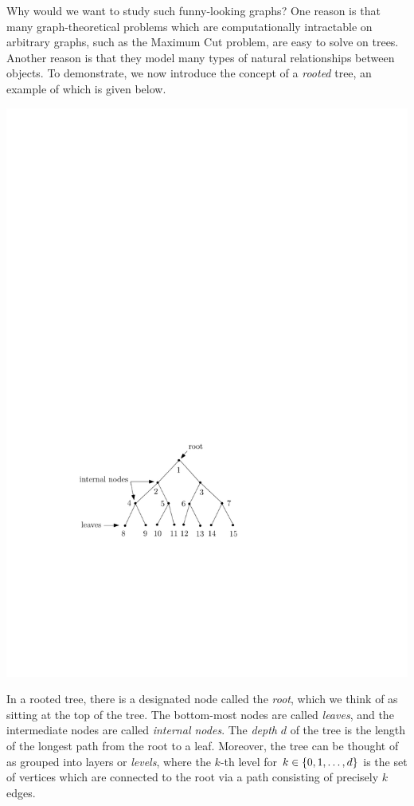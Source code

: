 \documentclass[11pt]{article}
\begin{document}
Why would we want to study such funny-looking graphs? One reason is that many graph-theoretical problems which are computationally intractable on arbitrary graphs, such as the Maximum Cut problem, are easy to solve on trees. Another reason is that they model many types of natural relationships between objects. To demonstrate, we now introduce the concept of a \emph{rooted} tree, an example of which is given below.

\begin{center}
\includegraphics[scale=0.8]{tree.pdf}
\end{center}
In a rooted tree, there is a designated node called the \emph{root}, which we think of as sitting at the top of the tree. The bottom-most nodes are called \emph{leaves}, and the intermediate nodes are called \emph{internal nodes}. The \emph{depth} $d$ of the tree is the length of the longest path from the root to a leaf. Moreover, the tree can be thought of as grouped into layers or \emph{levels}, where the $k$-th level for $k\in{\left\{0,1,\ldots,d\right\}}$ is the set of vertices which are connected to the root via a path consisting of precisely $k$ edges.
\end{document}

